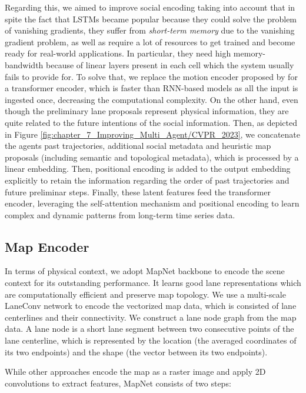 Regarding this, we aimed to improve social encoding taking into account that in spite the fact that \acp{LSTM} became popular because they could solve the problem of vanishing gradients, they suffer from \textit{short-term memory} due to the vanishing gradient problem, as well as require a lot of resources to get trained and become ready for real-world applications. In particular, they need high memory-bandwidth because of linear layers present in each cell which the system usually fails to provide for. To solve that, we replace the motion encoder proposed by \cite{wang2022ganet} for a transformer encoder, which is faster than \ac{RNN}-based models as all the input is ingested once, decreasing the computational complexity. On the other hand, even though the preliminary lane proposals represent physical information, they are quite related to the future intentions of the social information. Then, as depicted in Figure \ref{fig:chapter_7_Improving_Multi_Agent/CVPR_2023}, we concatenate the agents past trajectories, additional social metadata and heuristic map proposals (including semantic and topological metadata), which is processed by a linear embedding. Then, positional encoding is added to the output embedding explicitly to retain the information regarding the order of past trajectories and future preliminar steps. Finally, these latent features feed the transformer encoder, leveraging the self-attention mechanism and positional encoding to learn complex and dynamic patterns from long-term time series data. 

\subsection{Map Encoder}
\label{subsec:7_improving_efficiency_map_preprocessing_and_encoding}

In terms of physical context, we adopt MapNet \cite{liang2020learning} backbone to encode the scene context for its outstanding performance. It learns good lane representations which are computationally efficient and preserve map topology. We use a multi-scale LaneConv network to encode the vectorized map data, which is consisted of lane centerlines and their connectivity. We construct a lane node graph from the map data. A lane node is a short lane segment between two consecutive points of the lane centerline, which is represented by the location (the averaged coordinates of its two endpoints) and the shape (the vector between its two endpoints). 

While other approaches encode the map as a raster image and apply 2D convolutions to extract features, MapNet consists of two steps:

